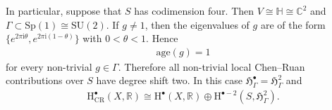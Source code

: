 \documentclass[psamsfonts]{amsart}
\theoremstyle{plain}
\theoremstyle{definition}{
\newtheorem{defi}{Definition}[section]
\newtheorem{ass}{Assumption}
\newtheorem*{nota}{Notation}}
\theoremstyle{remark}{
\newtheorem{rem}{Remark}
\newtheorem{ex}{Example}}
\theoremstyle{plain}{
\newtheorem{thm}{Theorem}[section]
\newtheorem{lem}{Lemma}[section]
\newtheorem{cor}{Corollary}[section]
\newtheorem{prop}{Proposition}[section]
\newtheorem{con}{Conjecture}[section]}
\newcommand{\m}[1]{{\mathrm{#1}}}
\begin{document}
In particular, suppose that $S$ has codimension four. Then
$V\cong\mathbb{H}\cong\mathbb{C}^2 $ and $\Gamma\subset\m{Sp}(1)\cong \m{SU}(2)$. If $g\neq 1$, then the eigenvalues of $g$ are of the form $\{e^{2\pi\m{i}\theta},e^{2\pi\m{i}(1-\theta)}\}$
with $0<\theta<1$. Hence
\begin{align*}
        \m{age}(g)=1
\end{align*}
for every non-trivial $g\in\Gamma$. Therefore all non-trivial local Chen--Ruan contributions over $S$ have degree shift two. In this case $\mathfrak{H}^\bullet_\Gamma=\mathfrak{H}^2_\Gamma$
and
\begin{align*}
        \m{H}^\bullet_{\m{CR}}(X,\mathbb{R})\cong\m{H}^\bullet(X,\mathbb{R})\oplus\m{H}^{\bullet-2}(S,\mathfrak{H}^2_\Gamma).
\end{align*}







\end{document}

